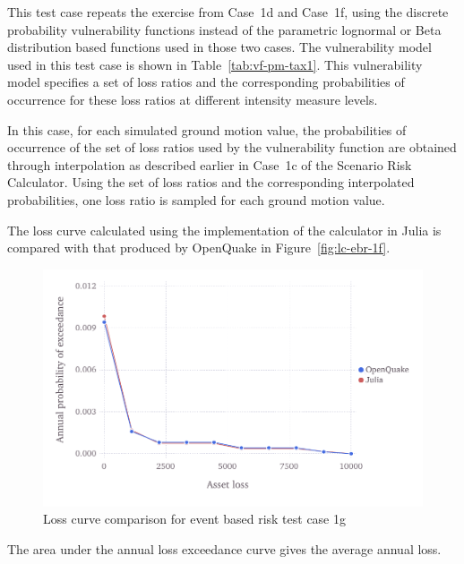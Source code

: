 This test case repeats the exercise from Case~1d and Case~1f, using the discrete probability vulnerability functions instead of the parametric lognormal or Beta distribution based functions used in those two cases. The vulnerability model used in this test case is shown in Table~\ref{tab:vf-pm-tax1}. This vulnerability model specifies a set of loss ratios and the corresponding probabilities of occurrence for these loss ratios at different intensity measure levels.

In this case, for each simulated ground motion value, the probabilities of occurrence of the set of loss ratios used by the vulnerability function are obtained through interpolation as described earlier in Case~1c of the Scenario Risk Calculator. Using the set of loss ratios and the corresponding interpolated probabilities, one loss ratio is sampled for each ground motion value.

The loss curve calculated using the implementation of the calculator in Julia is compared with that produced by OpenQuake in Figure~\ref{fig:lc-ebr-1f}.

\begin{figure}[htbp]
\centering
\includegraphics[width=12cm]{qareport/figures/fig-lc-ebr-1g}
\caption{Loss curve comparison for event based risk test case 1g}
\label{fig:lc-ebr-1g}
\end{figure}

The area under the annual loss exceedance curve gives the average annual loss.